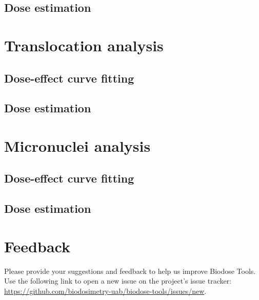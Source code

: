 \documentclass[]{scrartcl}
\begin{document}
\hypertarget{dose-estimation}{%
\subsection{Dose estimation}\label{dose-estimation}}

\hypertarget{stats-trans}{%
\section{Translocation analysis}\label{stats-trans}}

\hypertarget{dose-effect-curve-fitting-2}{%
\subsection{Dose-effect curve fitting}\label{dose-effect-curve-fitting-2}}

\hypertarget{dose-estimation-1}{%
\subsection{Dose estimation}\label{dose-estimation-1}}

\hypertarget{stats-micro}{%
\section{Micronuclei analysis}\label{stats-micro}}

\hypertarget{dose-effect-curve-fitting-3}{%
\subsection{Dose-effect curve fitting}\label{dose-effect-curve-fitting-3}}

\hypertarget{dose-estimation-2}{%
\subsection{Dose estimation}\label{dose-estimation-2}}

\hypertarget{appendix-appendices}{%
\appendix}


\hypertarget{appendix-feedback}{%
\section{Feedback}\label{appendix-feedback}}

Please provide your suggestions and feedback to help us improve Biodose Tools. Use the following link to open a new issue on the project's issue tracker: \url{https://github.com/biodosimetry-uab/biodose-tools/issues/new}.
\end{document}

